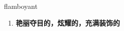 
\begin{frame}
{\huge flamboyant}
\begin{center}
\begin{enumerate}\Large
  \item \textbf{艳丽夺目的，炫耀的，充满装饰的}
\end{enumerate}
\end{center}
\end{frame}
